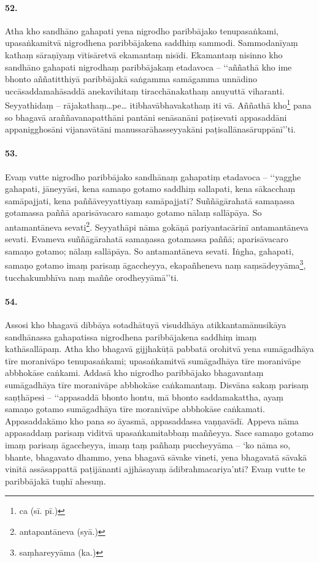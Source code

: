 \paragraph{52.} Atha kho sandhāno gahapati yena nigrodho paribbājako tenupasaṅkami, upasaṅkamitvā nigrodhena paribbājakena saddhiṃ sammodi. Sammodanīyaṃ kathaṃ sāraṇīyaṃ vītisāretvā ekamantaṃ nisīdi. Ekamantaṃ nisinno kho sandhāno gahapati nigrodhaṃ paribbājakaṃ etadavoca – ‘‘aññathā kho ime bhonto aññatitthiyā paribbājakā saṅgamma samāgamma unnādino uccāsaddamahāsaddā anekavihitaṃ tiracchānakathaṃ anuyuttā viharanti. Seyyathidaṃ – rājakathaṃ…pe… itibhavābhavakathaṃ iti vā. Aññathā kho\footnote{ca (sī. pī.)} pana so bhagavā araññavanapatthāni pantāni senāsanāni paṭisevati appasaddāni appanigghosāni vijanavātāni manussarāhasseyyakāni paṭisallānasāruppānī’’ti.

\paragraph{53.} Evaṃ vutte nigrodho paribbājako sandhānaṃ gahapatiṃ etadavoca – ‘‘yagghe gahapati, jāneyyāsi, kena samaṇo gotamo saddhiṃ sallapati, kena sākacchaṃ samāpajjati, kena paññāveyyattiyaṃ samāpajjati? Suññāgārahatā samaṇassa gotamassa paññā aparisāvacaro samaṇo gotamo nālaṃ sallāpāya. So antamantāneva sevati\footnote{antapantāneva (syā.)}. Seyyathāpi nāma gokāṇā pariyantacārinī antamantāneva sevati. Evameva suññāgārahatā samaṇassa gotamassa paññā; aparisāvacaro samaṇo gotamo; nālaṃ sallāpāya. So antamantāneva sevati. Iṅgha, gahapati, samaṇo gotamo imaṃ parisaṃ āgaccheyya, ekapañheneva naṃ saṃsādeyyāma\footnote{saṃhareyyāma (ka.)}, tucchakumbhīva naṃ maññe orodheyyāmā’’ti.

\paragraph{54.} Assosi kho bhagavā dibbāya sotadhātuyā visuddhāya atikkantamānusikāya sandhānassa gahapatissa nigrodhena paribbājakena saddhiṃ imaṃ kathāsallāpaṃ. Atha kho bhagavā gijjhakūṭā pabbatā orohitvā yena sumāgadhāya tīre moranivāpo tenupasaṅkami; upasaṅkamitvā sumāgadhāya tīre moranivāpe abbhokāse caṅkami. Addasā kho nigrodho paribbājako bhagavantaṃ sumāgadhāya tīre moranivāpe abbhokāse caṅkamantaṃ. Disvāna sakaṃ parisaṃ saṇṭhāpesi – ‘‘appasaddā bhonto hontu, mā bhonto saddamakattha, ayaṃ samaṇo gotamo sumāgadhāya tīre moranivāpe abbhokāse caṅkamati. Appasaddakāmo kho pana so āyasmā, appasaddassa vaṇṇavādī. Appeva nāma appasaddaṃ parisaṃ viditvā upasaṅkamitabbaṃ maññeyya. Sace samaṇo gotamo imaṃ parisaṃ āgaccheyya, imaṃ taṃ pañhaṃ puccheyyāma – ‘ko nāma so, bhante, bhagavato dhammo, yena bhagavā sāvake vineti, yena bhagavatā sāvakā vinītā assāsappattā paṭijānanti ajjhāsayaṃ ādibrahmacariya’nti? Evaṃ vutte te paribbājakā tuṇhī ahesuṃ.

